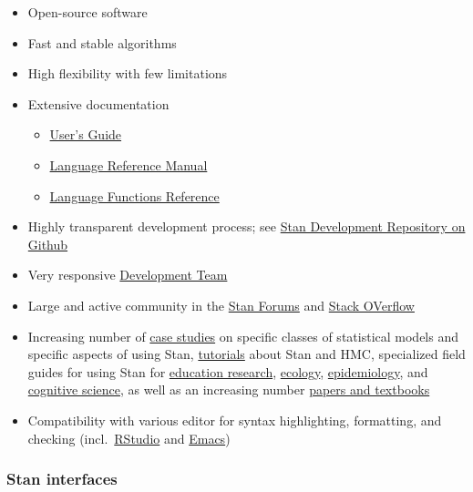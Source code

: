 \documentclass[
  11pt,
]{article}
\providecommand{\tightlist}{%
  \setlength{\itemsep}{0pt}\setlength{\parskip}{0pt}}
\begin{document}
\begin{itemize}
\tightlist
\item
  Open-source software
\item
  Fast and stable algorithms
\item
  High flexibility with few limitations
\item
  Extensive documentation

  \begin{itemize}
  \tightlist
  \item
    \href{https://mc-stan.org/docs/2_19/stan-users-guide/index.html}{User's Guide}
  \item
    \href{https://mc-stan.org/docs/2_19/reference-manual/index.html}{Language Reference Manual}
  \item
    \href{https://mc-stan.org/docs/2_19/functions-reference/index.html}{Language Functions Reference}
  \end{itemize}
\item
  Highly transparent development process; see \href{https://github.com/stan-dev/stan}{Stan Development Repository on Github}
\item
  Very responsive \href{https://mc-stan.org/about/team/}{Development Team}
\item
  Large and active community in the \href{https://discourse.mc-stan.org/}{Stan Forums} and \href{https://stackoverflow.com/questions/tagged/stan}{Stack OVerflow}
\item
  Increasing number of \href{https://mc-stan.org/users/documentation/case-studies.html}{case studies} on specific classes of statistical models and specific aspects of using Stan, \href{https://mc-stan.org/users/documentation/tutorials.html}{tutorials} about Stan and HMC, specialized field guides for using Stan for \href{https://education-stan.github.io/}{education research}, \href{https://stanecology.github.io/}{ecology}, \href{https://epidemiology-stan.github.io/}{epidemiology}, and \href{https://cognitive-science-stan.github.io/}{cognitive science}, as well as an increasing number \href{https://mc-stan.org/users/documentation/external.html}{papers and textbooks}
\item
  Compatibility with various editor for syntax highlighting, formatting, and checking (incl.~\href{https://www.rstudio.com/}{RStudio} and \href{https://www.gnu.org/software/emacs/}{Emacs})
\end{itemize}

\hypertarget{stan-interfaces}{%
\subsubsection{Stan interfaces}\label{stan-interfaces}}
\end{document}
